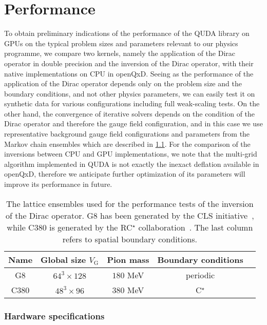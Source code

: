 \chapter{Performance}
\label{ch:p1:performance}

To obtain preliminary indications of the performance of the QUDA library on GPUs on the typical problem sizes and parameters relevant to our physics programme, we compare two kernels, namely the application of the Dirac operator in double precision and the inversion of the Dirac operator, with their native implementations on CPU in openQxD.
Seeing as the performance of the application of the Dirac operator depends only on the problem size and the boundary conditions, and not other physics parameters, we can easily test it on synthetic data for various configurations including full weak-scaling tests.
On the other hand, the convergence of iterative solvers depends on the condition of the Dirac operator and therefore the gauge field configuration, and in this case we use representative background gauge field configurations and parameters from the Markov chain ensembles which are described in \cref{tab:ensembles}.
For the comparison of the inversions between CPU and GPU implementations, we note that the multi-grid algorithm implemented in QUDA is not exactly the inexact deflation available in openQxD, therefore we anticipate further optimization of its parameters will improve its performance in future.

\begin{table}[h]
\centering
\begin{tabular}{ccccc}
Name & Global size $V_\mathrm{G}$ & Pion mass & Boundary conditions \\
\hline
G8   & $64^3 \times 128$ & $180$ MeV & periodic \\
C380 & $48^3 \times 96$  & $380$ MeV & C$^\star$ \\
\end{tabular}
\caption{The lattice ensembles used for the performance tests of the inversion of the Dirac operator. G8 has been generated by the CLS initiative~\cite{cls}, while C380 is generated by the RC$^\star$ collaboration~\cite{RCstar22}. The last column refers to spatial boundary conditions.}
\label{tab:ensembles}
\end{table}

\subsection{Hardware specifications}
\label{sec:hardware}

